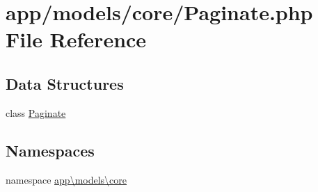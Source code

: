 \hypertarget{_paginate_8php}{\section{app/models/core/\-Paginate.php File Reference}
\label{_paginate_8php}
}
\subsection*{Data Structures}
\begin{DoxyCompactItemize}
\item 
class \hyperlink{classapp_1_1models_1_1core_1_1_paginate}{Paginate}
\end{DoxyCompactItemize}
\subsection*{Namespaces}
\begin{DoxyCompactItemize}
\item 
namespace \hyperlink{namespaceapp_1_1models_1_1core}{app\textbackslash{}models\textbackslash{}core}
\end{DoxyCompactItemize}
